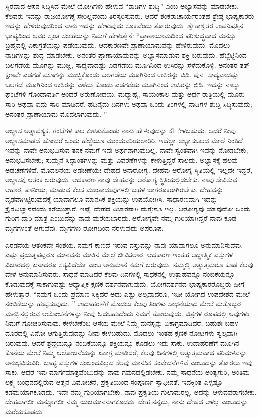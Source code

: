 ಸ್ಥಿರವಾದ ಆಸನ ಸಿದ್ಧಿಸಿದ ಮೇಲೆ ಯೋಗಿಗಳು ಹೇಳುವ “ನಾಡಿಗಳ ಶುದ್ಧಿ” ಎಂಬ ಅಭ್ಯಾಸವನ್ನು ಮಾಡಬೇಕು. ಕೆಲವರು ಇದನ್ನು ರಾಜಯೋಗಕ್ಕೆ ಸೇರಿಲ್ಲವೆಂದು ತಿರಸ್ಕರಿಸುವರು. ಆದರೆ ಶಂಕರಾಚಾರ್ಯರಂತಹ ಶ್ರೇಷ್ಠ ಭಾಷ್ಯಕಾರರು ಇದನ್ನು ಹೇಳಿರುವುದರಿಂದ ನಾನು ಇದನ್ನು ಹೇಳುವುದು ಸೂಕ್ತವೆಂದು ತೋರುವುದು. ಶ್ವೇತಾಶ್ವತರ ಉಪನಿಷತ್ತಿನ ಭಾಷ್ಯದಿಂದ ಅವರ ಸ್ವಂತ ಸಲಹೆಯನ್ನು ನಿಮಗೆ ಹೇಳುತ್ತೇನೆ: “ಪ್ರಾಣಾಯಾಮದಿಂದ ಪರಿಶುದ್ಧವಾದ ಮನಸ್ಸು ಬ್ರಹ್ಮದಲ್ಲಿ ಏಕಾಗ್ರತೆಯನ್ನು ಪಡೆಯುವುದು. ಆದಕಾರಣವೇ ಪ್ರಾಣಾಯಾಮವನ್ನು ಹೇಳಿರುವುದು. ಮೊದಲು ನಾಡಿಗಳನ್ನು ಶುದ್ಧ ಮಾಡಬೇಕು. ಅನಂತರ ಪ್ರಾಣಾಯಾಮವನ್ನು ಅಭ್ಯಾಸಮಾಡುವ ಶಕ್ತಿ ಬರುವುದು. ಹೆಬ್ಬೆಟ್ಟಿನಿಂದ ಬಲಗಡೆಯ ಮೂಗನ್ನು ಮುಚ್ಚಿ, ಸಾಧ್ಯವಾದಷ್ಟು ಎಡಗಡೆಯ ಮೂಗಿನಿಂದ ಉಸಿರನ್ನು ಸೆಳೆದುಕೊಳ್ಳಿ. ಅನಂತರ ತತ್​ಕ್ಷಣವೇ ಎಡಗಡೆ ಮೂಗನ್ನು ಮುಚ್ಚಿಕೊಂಡು ಬಲಗಡೆಯ ಮೂಗಿನಿಂದ ಉಸಿರನ್ನು ಬಿಡಿ. ಪುನಃ ಸಾಧ್ಯವಾದಷ್ಟು ಬಲಗಡೆ ಮೂಗಿನಿಂದ ಉಸಿರನ್ನು ಎಳೆದು ಕೊಂಡು ಎಡಗಡೆಯ ಮೂಗಿನಿಂದ ಉಸಿರನ್ನು ಬಿಡಿ. ಇದನ್ನು ನಾಲ್ಕು ಘಂಟೆಗಳಿ ಗೊಂದಾವರ್ತಿ ಅಂದರೆ ಅರುಣೋದಯ, ಮಧ್ಯಾಹ್ನ, ಸಾಯಂಕಾಲ ಮತ್ತು ಅರ್ಧ ರಾತ್ರಿಯಲ್ಲಿ ಮೂರು ಸಾರಿ ಅಥವಾ ಐದು ಸಾರಿ ಮಾಡಿದರೆ, ಹದಿನೈದು ದಿನಗಳು ಅಥವಾ ಒಂದು ತಿಂಗಳಲ್ಲಿ ನಾಡಿಗಳ ಶುದ್ದಿ ಸಿದ್ಧಿಸುವುದು; ಅನಂತರ ಪ್ರಾಣಾಯಾಮ ಮೊದಲಾಗುವುದು. ”

ಅಭ್ಯಾಸ ಅತ್ಯಾವಶ್ಯಕ. ಗಂಟೆಗಳ ಕಾಲ ಕುಳಿತುಕೊಂಡು ನಾನು ಹೇಳುವುದನ್ನು ಕlೇಳಬಹುದು. ಆದರೆ ನೀವು ಅಭ್ಯಾಸಮಾಡದೆ ಹೋದರೆ ಒಂದು ಹೆಜ್ಜೆಯೂ ಮುಂದುವರಿಯಲಾರಿರಿ. ಇದೆಲ್ಲಾ ಅಭ್ಯಾಸಬಲದ ಮೇಲೆ ನಿಂತಿದೆ. ಇವನ್ನು ನಾವೇ ಅನುಭವಿಸುವ ತನಕ ನಮಗೆ ಇವು ಅರ್ಥವಾಗುವುದಿಲ್ಲ. ನಾವೇ ಸ್ವಂತವಾಗಿ ಇವನ್ನು ನೋಡಬೇಕು; ಅನುಭವಿಸಬೇಕು; ಸುಮ್ಮನೆ ಸಿದ್ಧಾಂತಗಳನ್ನು ಮತ್ತು ವಿವರಣೆಗಳನ್ನು ಕೇಳುತ್ತಿದ್ದರೆ ಸಾಲದು. ಅಭ್ಯಾಸಕ್ಕೆ ಹಲವು ಅಡಚಣೆಗಳಿವೆ. ಮೊದಲನೆಯ ಅಡಚಣೆಯೇ ದೇಹದ ಅನಾರೋಗ್ಯ. ದೇಹವು ಆರೋಗ್ಯ ಸ್ಥಿತಿಯಲ್ಲಿ ಇಲ್ಲದೇ ಇದ್ದರೆ, ಅಭ್ಯಾಸಕ್ಕೆ ಆತಂಕ ಬರುವುದು. ಆದಕಾರಣ ನಾವು ದೇಹವನ್ನು ಆರೋಗ್ಯ ಸ್ಥಿತಿಯಲ್ಲಿಡಬೇಕು. ನಾವು ಸೇವಿಸುವ ಆಹಾರ, ಪಾನೀಯ, ಮಾಡುವ ಕೆಲಸ ಮುಂತಾದುವುಗಳಲ್ಲಿ ಬಹಳ ಜಾಗರೂಕರಾಗಿರಬೇಕು. ದೇಹವನ್ನು ದೃಢವಾಗಿಟ್ಟಿರುವುದಕ್ಕೆ ಯಾವಾಗಲೂ ಮಾನಸಿಕ ಶಕ್ತಿಯನ್ನು ಉಪಯೋಗಿಸಿ. ಸಾಧಾರಣವಾಗಿ ಇದನ್ನು ಕ್ರೈಸ್ತವಿಜ್ಞಾನವೆಂದು ಕರೆಯುತ್ತಾರೆ. ಇಷ್ಟೆ, ದೇಹದ ವಿಚಾರವಾಗಿ ಮತ್ತೇನೂ ಇಲ್ಲ. ಆರೋಗ್ಯವು ಯಾವುದೋ ಒಂದು ಗುರಿಗೆ ದಾರಿ ಮಾತ್ರ ಎಂಬುದನ್ನು ನಾವು ಮರೆಯಬಾರದು. ಆರೋಗ್ಯವೇ ನಮ್ಮ ಗುರಿಯಾಗಿದ್ದರೆ ನಾವು ಕೂಡ ಮೃಗಗಳಂತೆ ಆಗುವೆವು. ಮೃಗಗಳು ರೋಗದಿಂದ ನರಳುವುದು ಅಪರೂಪ. 

ಎರಡನೆಯ ಆತಂಕವೇ ಸಂಶಯ. ನಮಗೆ ಕಾಣದೆ ಇರುವ ವಸ್ತುವನ್ನು ನಾವು ಯಾವಾಗಲೂ ಅನುಮಾನಿಸುವೆವು. ಎಷ್ಟು ಪ್ರಯತ್ನಪಟ್ಟರೂ ಮಾನವನು ಮಾತಿನ ಮೇಲೆ ಜೀವಿಸಲಾರ. ಆದಕಾರಣ ಇಂತಹ ಆಧ್ಯಾತ್ಮಿಕ ವಸ್ತುಗಳ ವಿಚಾರದಲ್ಲಿ ಏನಾದರೂ ಸತ್ಯವಿದೆಯೇ ಎಂಬ ಅನುಮಾನ ನಮಗೆ ಬರುವುದು. ನಮ್ಮಲ್ಲಿ ಅತ್ಯುತ್ತಮರೂ ಕೂಡ ಕೆಲವು ವೇಳೆ ಅನುಮಾನಿಸುವರು. ಸಾಧನೆ ಮಾಡಿದರೆ ಕೆಲವು ದಿನಗಳಲ್ಲಿ ಸಾಧಕನಲ್ಲಿ ಉತ್ಸಾಹವನ್ನೂ ನಂಬಿಕೆಯನ್ನೂ ಕೊಡುವುದಕ್ಕೆ ಸಾಕಾಗುವಷ್ಟು ಆಧ್ಯಾತ್ಮಿಕ ಕ್ಷಣಿಕ ದರ್ಶನವಾಗುವುದು. ಯೋಗದರ್ಶನದ ಭಾಷ್ಯಕಾರರೊಬ್ಬರು ಹೀಗೆ ಹೇಳುತ್ತಾರೆ: “ನಮಗೆ ಒಂದು ಪ್ರಮಾಣ ಸಿಕ್ಕಿದರೆ ಅದು ಎಷ್ಟು ಅಲ್ಪವಾದರೂ, ಇಡೀ ಯೋಗದ ಉಪದೇಶದ ಮೇಲೆ ನಂಬಿಕೆಯನ್ನು ಹುಟ್ಟಿಸುವುದು. ” ಉದಾಹರಣೆಗೆ ಮೊದಲು ಕೆಲವು ತಿಂಗಳು ಸಾಧನೆಯಾದ ಮೇಲೆ ಮತ್ತೊಬ್ಬರ ಮನಸ್ಸಿನಲ್ಲಿರುವ ಆಲೋಚನೆಗಳನ್ನು ನೀವು ಓದಬಹುದೆಂದು ನಿಮಗೆ ತೋರುವುದು. ಚಿತ್ರಗಳ ರೂಪದಲ್ಲಿ ಅವುಗಳು ನಿಮಗೆ ಗೋಚರಿಸುವುವು. ಕೇಳಬೇಕೆಂಬ ಆಸೆಯ ಮೇಲೆ ನಿಮ್ಮ ಮನಸ್ಸನ್ನು ಏಕಾಗ್ರಮಾಡಿದರೆ, ಬಹುಶಃ ಬಹಳ ದೂರದಲ್ಲಿ ಏನೋ ಆಗುತ್ತಿರುವುದನ್ನು ನೀವು ಕೇಳಬಹುದು. ಮೊದಲು ಇಂತಹ ಕ್ಷಣಿಕ ನೋಟಗಳು ಸ್ವಲ್ಪವಾಗಿ ಬರುವುವು. ಆದರೆ ಶ್ರದ್ಧೆಯನ್ನೂ ನಂಬಿಕೆಯನ್ನೂ ಶಕ್ತಿಯನ್ನೂ ಕೊಡಲು ಇದು ಸಾಕು. ಉದಾಹರಣೆಗೆ ಮೂಗಿನ ಕೊನೆಯ ಮೇಲೆ ನಿಮ್ಮ ಆಲೋಚನೆಯನ್ನು ಏಕಾಗ್ರ ಮಾಡಿದರೆ, ಕೆಲವು ದಿನಗಳಲ್ಲಿ ಅತ್ಯುತ್ತಮವಾದ ಪರಿಮಳವನ್ನು ಅನುಭವಿಸುವಿರಿ. ಬಾಹ್ಯ ವಸ್ತುಗಳ ಸಂಬಂಧವಿಲ್ಲದ ಕೆಲವು ಮಾನಸಿಕ ಸಂವೇದನೆಗಳಿವೆ ಎಂಬುದನ್ನು ತೋರಲು ಇವು ಸಾಕು. ಆದರೆ ಇವು ಮಾರ್ಗಮಾತ್ರವೆಂಬುದನ್ನು ನಾವು ಗಮನದಲ್ಲಿಡಬೇಕು. ನಮ್ಮ ಸಾಧನೆಯ ಅಂತ್ಯಗುರಿ, ಅಂತಿಮ ಲಕ್ಷ್ಯ ಬಂಧನದಲ್ಲಿರುವ ಆತ್ಮನ ವಿಮೋಚನೆ, ಪ್ರಕೃತಿಯಿಂದ ಸಂಪೂರ್ಣ ಸ್ವಾಧೀನತೆ. ಇದಕ್ಕಿಂತ ಎಳ್ಳಷ್ಟೂ ಕಡಮೆಯಾಗಕೂಡದು. ಇದೇ ನಮ್ಮ ಗುರಿಯಾಗಬೇಕು. ನಾವು ಪ್ರಕೃತಿಯ ಗುಲಾಮರಲ್ಲ, ಅದನ್ನು ಆಳುವವರಾಗಬೇಕು. ದೇಹವಾಗಲೀ ಮನಸ್ಸಾಗಲೀ ನಮ್ಮ ಯಜಮಾನನಾಗಕೂಡದು. ದೇಹ ನನ್ನದು, ನಾನು ದೇಹದ ಆಳಲ್ಲ ಎಂಬುದನ್ನು ಮರೆಯಕೂಡದು. 

